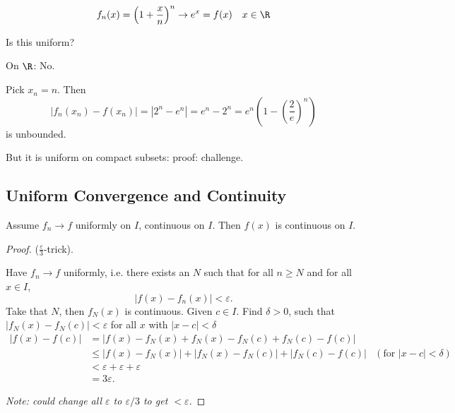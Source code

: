 \documentclass[10pt, a4paper]{article}
\begin{document}
\begin{example}
    \[
    f_n(x) = \left(1 + \frac{x}{n}\right) ^ n \to e ^ x = f(x)\quad x \in \R
    \]

    Is this uniform?

    \begin{solution}
        On $\R$:
        No.

        Pick $x_n = n$.
        Then
        \[
        |f_n(x_n) - f(x_n)| = |2 ^ n - e ^ n| = e ^ n - 2 ^ n = e ^ n\left(1 - \left(\frac{2}{e}\right) ^ n\right)
        \]
        is unbounded.

        But it is uniform on compact subsets:
        proof:
        challenge.
    \end{solution}
\end{example}

\subsection{Uniform Convergence and Continuity}

\begin{theorem}
    Assume $f_n \to f$ uniformly on $I$,
    continuous on $I$.
    Then $f(x)$ is continuous on $I$.

    \begin{proof}
        ($\frac{\varepsilon}{3}$-trick).

        Have $f_n \to f$ uniformly,
        i.e. there exists an $N$ such that for all $n \geq N$ and for all $x \in I$,
        \[
        |f(x) - f_n(x)| < \varepsilon.
        \]
        Take that $N$,
        then $f_N(x)$ is continuous.
        Given $c \in I$.
        Find $\delta > 0$,
        such that $|f_N(x) - f_N(c)| < \varepsilon$ for all $x$ with $|x - c| < \delta$
        \begin{align*}
            |f(x) - f(c)| &= |f(x) - f_N(x) + f_N(x) - f_N(c) + f_N(c) - f(c)| \\
            &\leq |f(x) - f_N(x)| + |f_N(x) - f_N(c)| + |f_N(c) - f(c)| &(\text{for $|x - c| < \delta$})\\
            &< \varepsilon + \varepsilon + \varepsilon \\
            &= 3\varepsilon.
        \end{align*}

        \textit{Note:
        could change all $\varepsilon$ to $\varepsilon / 3$ to get $<\varepsilon$.}
    \end{proof}
\end{theorem}
\end{document}
